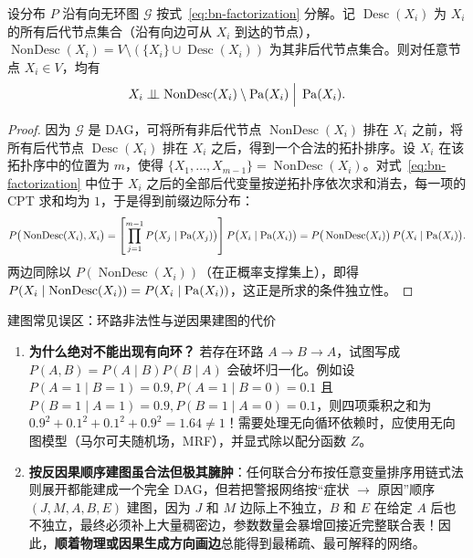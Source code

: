 \begin{thmBox}
\begin{theorem}\label{thm:local-markov}
设分布 $P$ 沿有向无环图 $\mathcal{G}$ 按式~\eqref{eq:bn-factorization} 分解。记 $\operatorname{Desc}(X_i)$ 为 $X_i$ 的所有后代节点集合（沿有向边可从 $X_i$ 到达的节点），$\operatorname{NonDesc}(X_i) = V \setminus (\{X_i\} \cup \operatorname{Desc}(X_i))$ 为其非后代节点集合。则对任意节点 $X_i \in V$，均有
\[
  X_i \perp\!\!\!\perp \operatorname{NonDesc}(X_i) \setminus \operatorname{Pa}(X_i) \;\Big|\; \operatorname{Pa}(X_i).
\]
\end{theorem}
\end{thmBox}

\begin{proof}
因为 $\mathcal{G}$ 是 DAG，可将所有非后代节点 $\operatorname{NonDesc}(X_i)$ 排在 $X_i$ 之前，将所有后代节点 $\operatorname{Desc}(X_i)$ 排在 $X_i$ 之后，得到一个合法的拓扑排序。设 $X_i$ 在该拓扑序中的位置为 $m$，使得 $\{X_1,\dots,X_{m-1}\} = \operatorname{NonDesc}(X_i)$。对式~\eqref{eq:bn-factorization} 中位于 $X_i$ 之后的全部后代变量按逆拓扑序依次求和消去，每一项的 CPT 求和均为 $1$，于是得到前缀边际分布：
\[
  P\big(\operatorname{NonDesc}(X_i), X_i\big)
  = \left[\prod_{j=1}^{m-1} P\big(X_j \mid \operatorname{Pa}(X_j)\big)\right] P\big(X_i \mid \operatorname{Pa}(X_i)\big)
  = P\big(\operatorname{NonDesc}(X_i)\big)\, P\big(X_i \mid \operatorname{Pa}(X_i)\big).
\]
两边同除以 $P(\operatorname{NonDesc}(X_i))$（在正概率支撑集上），即得 $P(X_i \mid \operatorname{NonDesc}(X_i)) = P(X_i \mid \operatorname{Pa}(X_i))$，这正是所求的条件独立性。
\end{proof}

\begin{failBox}{建图常见误区：环路非法性与逆因果建图的代价}
\begin{enumerate}
  \item \textbf{为什么绝对不能出现有向环？} 若存在环路 $A \to B \to A$，试图写成 $P(A,B) = P(A\mid B)P(B\mid A)$ 会破坏归一化。例如设 $P(A=1\mid B=1)=0.9, P(A=1\mid B=0)=0.1$ 且 $P(B=1\mid A=1)=0.9, P(B=1\mid A=0)=0.1$，则四项乘积之和为 $0.9^2 + 0.1^2 + 0.1^2 + 0.9^2 = 1.64 \neq 1$！需要处理无向循环依赖时，应使用无向图模型（马尔可夫随机场，MRF），并显式除以配分函数 $Z$。
  \item \textbf{按反因果顺序建图虽合法但极其臃肿}：任何联合分布按任意变量排序用链式法则展开都能建成一个完全 DAG，但若把警报网络按“症状 $\to$ 原因”顺序 $(J, M, A, B, E)$ 建图，因为 $J$ 和 $M$ 边际上不独立，$B$ 和 $E$ 在给定 $A$ 后也不独立，最终必须补上大量稠密边，参数数量会暴增回接近完整联合表！因此，\textbf{顺着物理或因果生成方向画边}总能得到最稀疏、最可解释的网络。
\end{enumerate}
\end{failBox}

